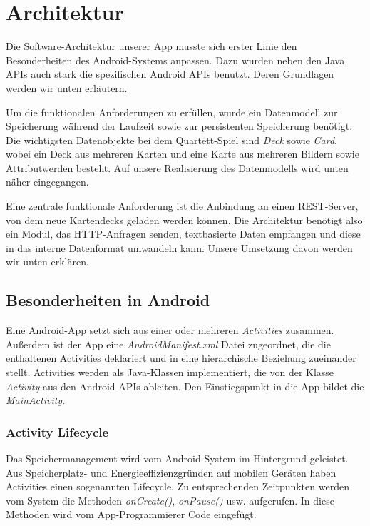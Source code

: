 \chapter{Architektur}
\label{cha:architektur}

Die Software-Architektur unserer App musste sich erster Linie den Besonderheiten des Android-Systems anpassen. Dazu wurden neben den Java APIs auch stark die spezifischen Android APIs benutzt. Deren Grundlagen werden wir unten erläutern.

Um die funktionalen Anforderungen zu erfüllen, wurde ein Datenmodell zur Speicherung während der Laufzeit sowie zur persistenten Speicherung benötigt. Die wichtigsten Datenobjekte bei dem Quartett-Spiel sind \emph{Deck} sowie \emph{Card}, wobei ein Deck aus mehreren Karten und eine Karte aus mehreren Bildern sowie Attributwerden besteht. Auf unsere Realisierung des Datenmodells wird unten näher eingegangen.

Eine zentrale funktionale Anforderung ist die Anbindung an einen REST-Server, von dem neue Kartendecks geladen werden können. Die Architektur benötigt also ein Modul, das HTTP-Anfragen senden, textbasierte Daten empfangen und diese in das interne Datenformat umwandeln kann. Unsere Umsetzung davon werden wir unten erklären.

\section{Besonderheiten in Android}
\label{sec:besonderheiten_android}

Eine Android-App setzt sich aus einer oder mehreren \emph{Activities} zusammen. Außerdem ist der App eine \emph{AndroidManifest.xml} Datei zugeordnet, die die enthaltenen Activities deklariert und in eine hierarchische Beziehung zueinander stellt. Activities werden als Java-Klassen implementiert, die von der Klasse \emph{Activity} aus den Android APIs ableiten. Den Einstiegspunkt in die App bildet die \emph{MainActivity}.

\subsection{Activity Lifecycle}

Das Speichermanagement wird vom Android-System im Hintergrund geleistet. Aus Speicherplatz- und Energieeffizienzgründen auf mobilen Geräten haben Activities einen sogenannten Lifecycle. Zu entsprechenden Zeitpunkten werden vom System die Methoden \emph{onCreate()}, \emph{onPause()} usw. aufgerufen. In diese Methoden wird vom App-Programmierer Code eingefügt.

